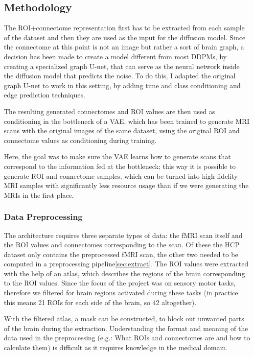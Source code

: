 	\subsection{Methodology}
	
	The ROI+connectome representation first has to be extracted from each sample of the dataset and then they are used as the input for the diffusion model. Since the connectome at this point is not an image but rather a sort of brain graph, a decision has been made to create a model different from most DDPMs, by creating a specialized graph U-net, that can serve as the neural network inside the diffusion model that predicts the noise. To do this, I adapted the original graph U-net\cite{graph-u-net} to work in this setting, by adding time and class conditioning and edge prediction techniques.
	
	The resulting generated connectomes and ROI values are then used as conditioning in the bottleneck of a VAE, which has been trained to generate MRI scans with the original images of the same dataset, using the original ROI and connectome values as conditioning during training. 
	
	Here, the goal was to make sure the VAE learns how to generate scans that correspond to the information fed at the bottleneck; this way it is possible to generate ROI and connectome samples, which can be turned into high-fidelity MRI samples with significantly less resource usage than if we were generating the MRIs in the first place.
	
	\subsubsection{Data Preprocessing}
	
	The architecture requires three separate types of data: the fMRI scan itself and the ROI values and connectomes corresponding to the scan. Of these the HCP dataset only contains the preprocessed fMRI scan, the other two needed to be computed in a preprocessing pipeline\ref{sec:extract}. The ROI values were extracted with the help of an atlas, which describes the regions of the brain corresponding to the ROI values. Since the focus of the project was on sensory motor tasks, therefore we filtered for brain regions activated during these tasks (in practice this means 21 ROIs for each side of the brain, so 42 altogether). 
	
	With the filtered atlas, a mask can be constructed, to block out unwanted parts of the brain during the extraction. Understanding the format and meaning of the data used in the preprocessing (e.g.: What ROIs and connectomes are and how to calculate them) is difficult as it requires knowledge in the medical domain. 
	
